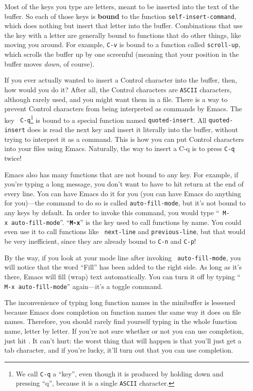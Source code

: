         Most of the keys you type are letters, meant to be inserted
into the text of the buffer.  So each of those keys is {\bf bound} to
the function {\tt self-insert-command}, which does nothing but insert
that letter into the buffer.  Combinations that use the 
key with a letter are generally bound to functions that do other
things, like moving you around.  For example, {\tt C-v} is bound to a
function called {\tt scroll-up}, which scrolls the buffer up by one
screenful (meaning that your position in the buffer moves {\em
down\/}, of course).

        If you ever actually wanted to insert a Control character into
the buffer, then, how would you do it?  After all, the Control
characters are {\tt ASCII} characters, although rarely used, and you
might want them in a file.  There is a way to prevent Control
characters from being interpreted as commands by Emacs.  The key {\tt
C-q}\footnote{We call {\tt C-q} a ``key'', even though it is produced
by holding down  and pressing ``q'', because it is a
single {\tt ASCII} character.} is bound to a special function named
{\tt quoted-insert}.  All {\tt quoted-insert} does is read the next
key and insert it literally into the buffer, without trying to
interpret it as a command.  This is how you can put Control characters
into your files using Emacs.  Naturally, the way to insert a C-q is to
press {\tt C-q} twice!

Emacs also has many functions that are not bound to any key.  For
example, if you're typing a long message, you don't want to have to
hit return at the end of every line.  You can have Emacs do it for you
(you can have Emacs do anything for you)---the command to do so is
called {\tt auto-fill-mode}, but it's not bound to any keys by
default.  In order to invoke this command, you would type ``{\tt
  M-x~auto-fill-mode}''.  ``{\bf\tt M-x}'' is the key used to call
functions by name.  You could even use it to call functions like {\tt
  next-line} and {\tt previous-line}, but that would be very
inefficient, since they are already bound to {\tt C-n} and {\tt C-p}!

        By the way, if you look at your mode line after invoking {\tt
auto-fill-mode}, you will notice that the word ``Fill'' has been added
to the right side.  As long as it's there, Emacs will fill (wrap) text
automatically.  You can turn it off by typing ``{\tt
M-x~auto-fill-mode}'' again---it's a toggle command.

        The inconvenience of typing long function names in the
minibuffer is lessened because Emacs does completion on function names
the same way it does on file names.  Therefore, you should rarely find
yourself typing in the whole function name, letter by letter.  If
you're not sure whether or not you can use completion, just hit
.  It can't hurt: the worst thing that will happen is that
you'll just get a tab character, and if you're lucky, it'll turn out
that you can use completion.


